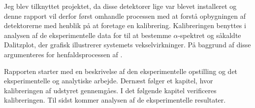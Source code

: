 Jeg blev tilknyttet projektet, da disse detektorer lige var blevet installeret og denne rapport vil
derfor først omhandle processen med at forstå opbygningen af detektorerne med henblik på at foretage
en kalibrering. Kalibreringen benyttes i analysen af de eksperimentelle data for \Carb til at
bestemme $\alpha$-spektret og såkaldte Dalitzplot, der grafisk illustrerer systemets vekselvirkninger. På
baggrund af disse argumenteres for henfaldsprocessen af \Carb.

Rapporten starter med en beskrivelse af den eksperimentelle opstilling og det eksperimentelle og
analytiske arbejde. Dernæst følger et kapitel, hvor kalibreringen af udstyret gennemgåes. I det
følgende kapitel verificeres kalibreringen. Til sidst kommer analysen af de eksperimentelle
resultater.






